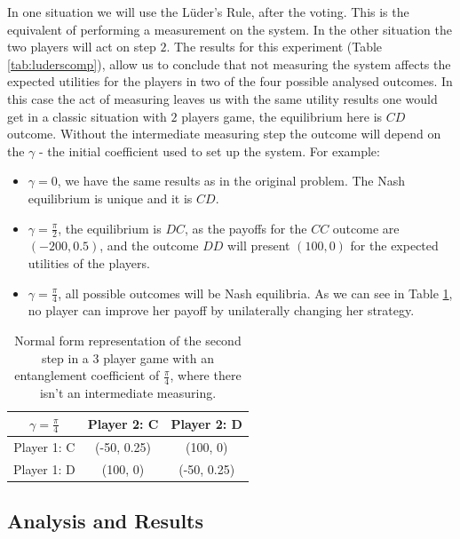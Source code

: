 In one situation we will use the L\"{u}der's Rule, after the voting. This is the equivalent of performing a measurement on the system. In the other situation the two players will act on step $2$. The results for this experiment (Table \ref{tab:luderscomp}), allow us to conclude that not measuring the system affects the expected utilities for the players in two of the four possible analysed outcomes. In this case the act of measuring leaves us with the same utility results one would get in a classic situation with $2$ players game, the equilibrium here is $CD$ outcome. Without the intermediate measuring step the outcome will depend on the $\gamma$ - the initial coefficient used to set up the system. For example:

\begin{itemize}
\item $\gamma = 0$, we have the same results as in the original problem. The Nash equilibrium is unique and it is $CD$.
\item $\gamma = \frac{\pi}{2}$, the equilibrium is $DC$, as the payoffs for the $CC$ outcome are $(-200, 0.5)$, and the outcome $DD$ will present $(100, 0)$ for the expected utilities of the players.
\item $\gamma = \frac{\pi}{4}$, all possible outcomes will be Nash equilibria. As we can see in Table \ref{tab:hate_myself}, no player can improve her payoff by unilaterally changing her strategy.



\end{itemize}

\begin{center}
\begin{table}
\begin{centering}
\begin{tabular}{ccc}
\hline 
 $\gamma = \frac{\pi}{4}$ & Player 2: C & Player 2: D\tabularnewline
\hline 
Player 1: C & (-50, 0.25) & (100, 0)\tabularnewline
Player 1: D & (100, 0) & (-50, 0.25)\tabularnewline
\hline 
\end{tabular}
\par\end{centering}

\caption{Normal form representation of the second step in a 3 player game with an entanglement coefficient of $\frac{\pi}{4}$, where there isn't an intermediate measuring. }
\label{tab:hate_myself}
\end{table}
\end{center}


\subsection{Analysis and Results}
\label{subsec:description_3}


